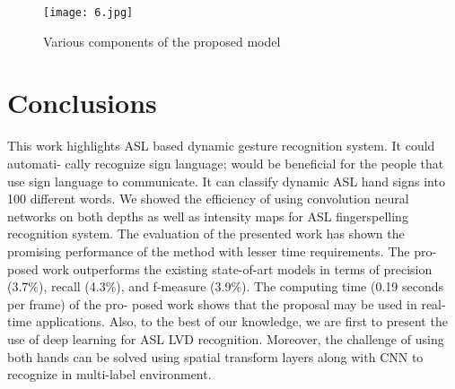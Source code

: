 \documentclass[
  manuscript=article,  %
  layout=preprint,  %
  year=20xx,
  volume=x,
]{ledger}
\begin{document}
\begin{figure}[h!]
    \centering
    \texttt{[image: 6.jpg]}
    \caption{Various components of the proposed model}
    \label{f3}
\end{figure}


\section{Conclusions}
This work highlights ASL based dynamic gesture recognition system. It could automati- cally recognize sign language; would be beneficial for the people that use sign language to communicate. It can classify dynamic ASL hand signs into 100 different words. We showed the efficiency of using convolution neural networks on both depths as well as intensity maps for ASL fingerspelling recognition system. The evaluation of the presented work has shown the promising performance of the method with lesser time requirements. The pro- posed work outperforms the existing state-of-art models in terms of precision (3.7\%), recall (4.3\%), and f-measure (3.9\%). The computing time (0.19 seconds per frame) of the pro- posed work shows that the proposal may be used in real-time applications. Also, to the best of our knowledge, we are first to present the use of deep learning for ASL LVD recognition. Moreover, the challenge of using both hands can be solved using spatial transform layers along with CNN to recognize in multi-label environment.




\end{document}

